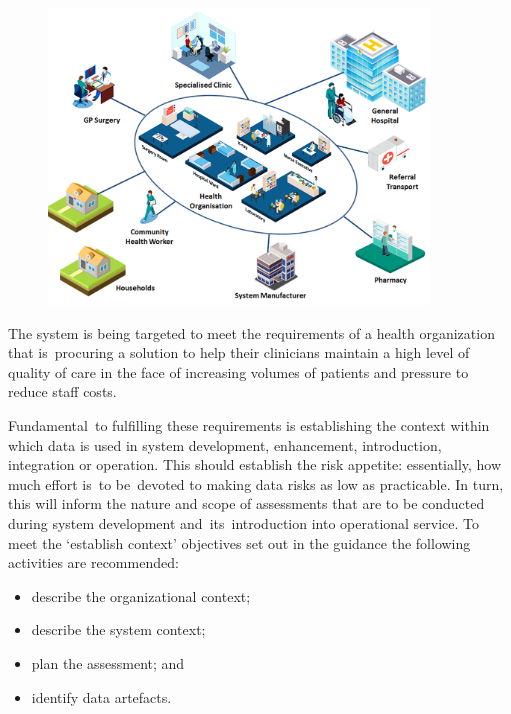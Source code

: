 \begin{figure}[H]
  \centering
  \includegraphics[width=0.9\textwidth]{images/medicalscenario}
  \label{fig:medicalscenario}
\end{figure}

\clearpage
The system is being targeted to meet the requirements of a health organization \cbstart that is\cbend\ procuring a solution to help their clinicians maintain a high level of quality of care in the face of increasing volumes of patients and pressure to reduce staff costs.

\cbstart Fundamental\cbend\ to fulfilling these requirements is establishing the context within which \cbstart data is used in system development, enhancement, introduction, integration or operation\cbend. This should establish the risk appetite: essentially, how much effort is\cbstart\ to be\cbend\ devoted to making data risks as low as practicable. In turn, this will inform the nature and scope of assessments that are to be conducted during system development and\cbstart\ its\cbend\ introduction into operational service. To meet the `establish context' objectives set out in the guidance the following activities are recommended:

\begin{itemize}
	\item describe the organizational context;
	\item describe the system context;
	\item plan the assessment; and
	\item identify \glspl{data artefact}.
\end{itemize}

